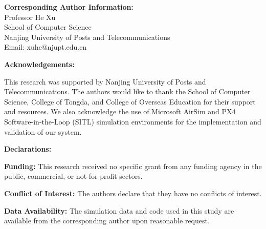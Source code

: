 \documentclass[12pt]{article}
\begin{document}
\begin{center}
\vspace{2cm}

{\large
\textbf{Corresponding Author Information:}\\
Professor He Xu\\
School of Computer Science\\
Nanjing University of Posts and Telecommunications\\
Email: xuhe@njupt.edu.cn\\
}

\vspace{2cm}

{\large
\textbf{Acknowledgements:}\\
}

\vspace{0.5cm}

This research was supported by Nanjing University of Posts and Telecommunications. The authors would like to thank the School of Computer Science, College of Tongda, and College of Overseas Education for their support and resources. We also acknowledge the use of Microsoft AirSim and PX4 Software-in-the-Loop (SITL) simulation environments for the implementation and validation of our system.

\vspace{1cm}

{\large
\textbf{Declarations:}\\
}

\vspace{0.5cm}

\textbf{Funding:} This research received no specific grant from any funding agency in the public, commercial, or not-for-profit sectors.

\vspace{0.5cm}

\textbf{Conflict of Interest:} The authors declare that they have no conflicts of interest.

\vspace{0.5cm}

\textbf{Data Availability:} The simulation data and code used in this study are available from the corresponding author upon reasonable request.

\end{center}
\end{document}

